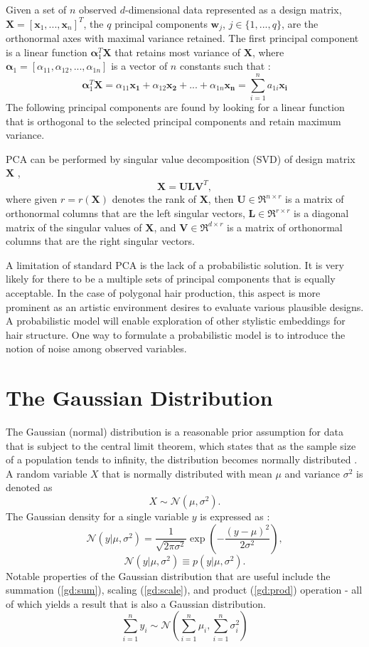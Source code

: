 \documentclass[ %
author={Dillon Keith Diep},
supervisor={Dr. Carl Henrik Ek},
degree={MEng},
title={ART-CG:},
subtitle={Assisted Real-time Content Generation of 3D Hair by Learning Manifolds},
type={Research},
year={2017} ]{dissertation}
\begin{document}
Given a set of $n$ observed $d$-dimensional data represented as a design matrix, $\bm{X}=[\bm{x}_1,...,\bm{x}_n]^T$, the $q$ principal components $\bm{w}_j$, $j \in \{1,...,q\}$, are the orthonormal axes with maximal variance retained. The first principal component is a linear function $\bm{\alpha}^T_1\bm{X}$ that retains most variance of $\bm{X}$, where $\bm{\alpha}_1 = [\alpha_{11}, \alpha_{12}, ..., \alpha_{1n}]$ is a vector of $n$ constants such that \cite[p.4]{pca2002}:
$$\bm{\alpha}^T_1\bm{X}=\alpha_{11}\bm{x_1}+\alpha_{12}\bm{x_2}+...+\alpha_{1n}\bm{x_n} = \sum^n_{i=1}a_{1i}\bm{x_i}$$
The following principal components are found by looking for a linear function that is orthogonal to the selected principal components and retain maximum variance.

PCA can be performed by singular value decomposition (SVD) of design matrix $\bm{X}$ \cite[pp.44-46]{pca2002},
$$\bm{X=ULV}^T,$$
where given $r = r(\bm{X})$ denotes the rank of $\bm{X}$, then
$\bm{U} \in \Re^{n \times r}$ is a matrix of orthonormal columns that are the left singular vectors,
$\bm{L} \in \Re^{r \times r}$ is a diagonal matrix of the singular values of $\bm{X}$, and
$\bm{V} \in \Re^{d \times r}$ is a matrix of orthonormal columns that are the right singular vectors.

A limitation of standard PCA is the lack of a probabilistic solution. 
It is very likely for there to be a multiple sets of principal components that is equally acceptable. In the case of polygonal hair production, this aspect is more prominent as an artistic environment desires to evaluate various plausible designs. A probabilistic model will enable exploration of other stylistic embeddings for hair structure. One way to formulate a probabilistic model is to introduce the notion of noise among observed variables.

\section{The Gaussian Distribution}
The Gaussian (normal) distribution is a reasonable prior assumption for data that is subject to the central limit theorem, which states that as the sample size of a population tends to infinity, the distribution becomes normally distributed \cite[p.78]{bishop}.
A random variable $X$ that is normally distributed with mean $\mu$ and variance $\sigma^2$ is denoted as
$$X\sim\mathcal{N}(\mu, \sigma^2).$$
The Gaussian density for a single variable $y$ is expressed as \cite[p.78]{bishop}:
$$\mathcal{N}(y|\mu, \sigma^2)=\frac{1}{\sqrt{2\pi\sigma^2}}\exp\left(-\frac{(y-\mu)^2}{2\sigma^2}\right),$$
$$\mathcal{N}(y|\mu,\sigma^2) \equiv p(y|\mu,\sigma^2).$$
Notable properties of the Gaussian distribution that are useful include the summation (\ref{gd:sum}), scaling (\ref{gd:scale}), and product (\ref{gd:prod}) operation - all of which yields a result that is also a Gaussian distribution\cite[p.200]{gp}.
\begin{equation} \label{gd:sum}
\sum^n_{i=1}y_i\sim\mathcal{N}(\sum^n_{i=1}\mu_i,\sum^n_{i=1}\sigma^2_i)
\end{equation}
\end{document}
